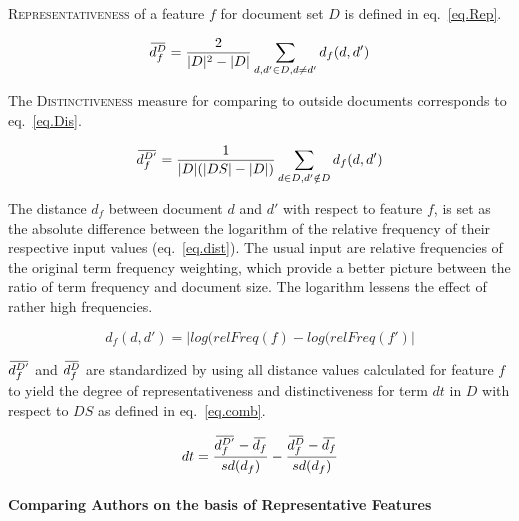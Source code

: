 \documentclass[a4paper,10pt,twoside,fleqn]{article}
\newcommand{\overbar}[1]{\mkern 2.0mu\overline{\mkern-2.0mu#1\mkern-2.0mu}\mkern 2.0mu}
\begin{document}
\textsc{Representativeness} of a feature $f$ for document set $D$ is defined 
in eq.~\ref{eq.Rep}.


\begin{equation}\label{eq.Rep}
 \overbar{d_f^{D}} = \frac{2}{|D|^2 -|D|} \sum\limits_{d,d' \in D,d \neq d'} d_f(d,d')
\end{equation}



The \textsc{Distinctiveness} measure for comparing to outside documents corresponds 
to eq.~\ref{eq.Dis}.


\begin{equation}\label{eq.Dis}
 \overbar{d_f^{D'}} = \frac{1}{|D|(|DS| -|D|)} \sum\limits_{d \in D, d'\notin D} d_f(d,d')
\end{equation}


The distance $d_f$ between document $d$ and $d'$ with respect to feature $f$, is set as the 
absolute difference between the logarithm of the relative frequency of their respective
input values (eq.~\ref{eq.dist}).
The usual input are relative frequencies of the original term frequency weighting, which provide a 
better picture between the ratio of term frequency and document size. 
The logarithm lessens the effect of rather high frequencies. %

\begin{equation} \label{eq.dist}
 d_f(d,d') = |log(relFreq(f) - log(relFreq(f')|
\end{equation}


$\overbar{d_f^{D'}}$  and $\overbar{d_f^{D}}$ are standardized by using all 
distance values calculated for feature $f$ to yield the 
degree of representativeness and distinctiveness for
term $dt$ in $D$ with respect to $DS$ as defined in eq.~\ref{eq.comb}.
 
 \begin{equation}\label{eq.comb}
 dt = \frac{\overbar{d^{D'}_f} - \overbar{d_f} }{sd(d_f)} - \frac{\overbar{d^{D}_f} - \overbar{d_f}}{sd(d_f)}
\end{equation}


\paragraph{Comparing Authors on the basis of Representative Features}
\end{document}
